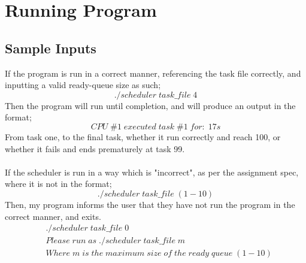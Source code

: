 \documentclass{article}
\begin{document}
    \section{Running Program}
      \subsection{Sample Inputs}
        If the program is run in a correct manner, referencing the task file correctly, and inputting a valid ready-queue size as such;
        \begin{equation*}
            ./scheduler\;task\_file\;4
        \end{equation*}
        Then the program will run until completion, and will produce an output in the format;
        \begin{equation*}
            CPU\;\#1\;executed\;task\;\#1\;for:\;17s
        \end{equation*}
        From task one, to the final task, whether it run correctly and reach 100, or whether it fails and ends prematurely at task 99.\\
        \\
        If the scheduler is run in a way which is "incorrect", as per the assignment spec, where it is not in the format;
        \begin{equation*}
            ./scheduler\;task\_file\;(1-10)
        \end{equation*}
        Then, my program informs the user that they have not run the program in the correct manner, and exits.
        \begin{align*}
          &./scheduler\;task\_file\;0 \\
          &Please\;run\;as\;./scheduler\;task\_file\;m \\
          &Where\;m\;is\;the\;maximum\;size\;of\;the\;ready\;queue\;(1-10)
        \end{align*}
\end{document}
